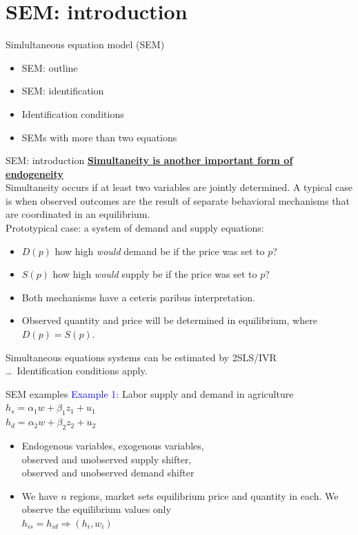 \documentclass[usenames,dvipsnames]{beamer}
\begin{document}
\section{SEM: introduction}
\begin{frame}{Simlultaneous equation model (SEM)}
    \begin{itemize}
        \item SEM: outline
        \bigskip
        \item SEM: identification
        \bigskip
        \item Identification conditions
        \bigskip
        \item SEMs with more than two equations
    \end{itemize}
\end{frame}
\begin{frame}{SEM: introduction}
\underline{\textbf{Simultaneity is another important form of endogeneity}}\\
\bigskip
Simultaneity occurs if at least two variables are jointly determined. A typical case is when observed outcomes are the result of separate behavioral mechanisms that are coordinated in an equilibrium. 
\medskip
\\Prototypical case: a system of demand and supply equations:
\begin{itemize}
\item $D(p) $ how high \textit{would} demand be if the price was set to $p$?
\item $S(p) $ how high \textit{would} supply be if the price was set to $p$?
\vspace{0.2cm}
\item Both mechanisms have a ceteris paribus interpretation.
\item Observed quantity and price will be determined in equilibrium, where $D(p)=S(p)$.
\end{itemize}
\medskip
Simultaneous equations systems can be estimated by 2SLS/IVR\\
\dots ~Identification conditions apply.
\end{frame}
\begin{frame}{SEM examples}
\textcolor{Blue}{Example 1:} Labor supply and demand in agriculture \\
\bigskip
\qquad $h_s  = \alpha_1 w + \beta_1 z_1 + u_1$ \\
\qquad $h_d  = \alpha_2 w + \beta_2 z_2 + u_2$ \\
\begin{itemize}
\item Endogenous variables, exogenous variables, \\observed and unobserved supply shifter, \\observed and unobserved demand shifter\\
\medskip
\item We have $n$ regions, market sets equilibrium price and quantity in each. We observe the equilibrium values only \\
\vspace{0.3cm}
$h_{is} = h_{id} \Rightarrow (h_i, w_i)$
\end{itemize}
\end{frame}
\end{document}
